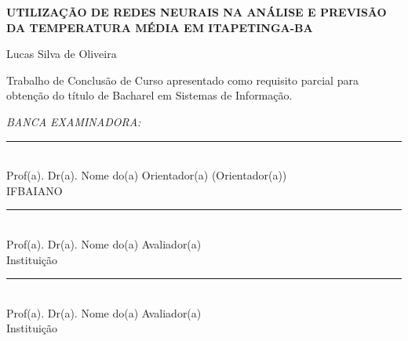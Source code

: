 \documentclass[12pt, openright, a4paper, brazil, oneside]{abntex2}
\begin{document}
    \newpage
    \begin{center}
        \begin{center}
            \ABNTEXchapterfont\bfseries\LARGE UTILIZAÇÃO DE REDES NEURAIS NA ANÁLISE E PREVISÃO DA TEMPERATURA MÉDIA EM ITAPETINGA-BA
        \end{center}

        \vspace{3cm}

        \begin{center}
            {\ABNTEXchapterfont\large Lucas Silva de Oliveira}
        \end{center}

        \vspace{4cm}
    
        \begin{flushright}
            \begin{minipage}{8.6cm}
                Trabalho de Conclusão de Curso apresentado como 
                requisito parcial para obtenção 
                do título de Bacharel em Sistemas de Informação.
            \end{minipage}
        \end{flushright}
        

        \vspace{1cm}
        
        \begin{center}

            \textit{BANCA EXAMINADORA:}
            \vspace{2cm}

            \begin{minipage}{12cm}
                \begin{center}
                    \rule{10.5cm}{0.5pt} \\ %
                    Prof(a). Dr(a). Nome do(a) Orientador(a) (Orientador(a)) \\ IFBAIANO \\
                    \vspace{0.5cm}
                    \rule{10.5cm}{0.5pt} \\ %
                    Prof(a). Dr(a). Nome do(a) Avaliador(a) \\ Instituição \\
                    \vspace{0.5cm}
                    \rule{10.5cm}{0.5pt} \\ %
                    Prof(a). Dr(a). Nome do(a) Avaliador(a) \\ Instituição
                \end{center}
            \end{minipage}
        \end{center}
    \end{center}
\end{document}
